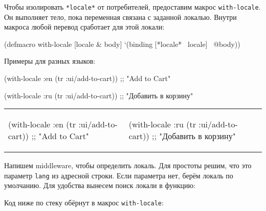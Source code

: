 
Чтобы изолировать \verb|*locale*| от потребителей, предоставим макрос
\verb|with-locale|. Он выполняет тело, пока переменная связана с заданной
локалью. Внутри макроса любой перевод сработает для этой локали:

\begin{english}
  \begin{clojure}
(defmacro with-locale
  [locale & body]
  `(binding [*locale* ~locale]
     ~@body))
  \end{clojure}
\end{english}

Примеры для разных языков:

\ifnarrow

\begin{clojure}
(with-locale :en
  (tr :ui/add-to-cart))
;; "Add to Cart"
\end{clojure}

\splitter

\begin{clojure}
(with-locale :ru
  (tr :ui/add-to-cart))
;; "Добавить в корзину"
\end{clojure}

\else


\noindent
\begin{tabular}{ @{}p{5cm} @{}p{5cm} }

  \begin{clojure}
(with-locale :en
  (tr :ui/add-to-cart))
;; "Add to Cart"
  \end{clojure}

&

  \begin{clojure}
(with-locale :ru
  (tr :ui/add-to-cart))
;; "Добавить в корзину"
  \end{clojure}

\end{tabular}


\fi


Напишем middleware, чтобы определить локаль. Для простоты решим, что это
параметр \verb|lang| из адресной строки. Если параметра нет, берём локаль по
умолчанию. Для удобства вынесем поиск локали в функцию:

Код ниже по стеку обёрнут в макрос \texttt{with\--lo\-ca\-le}:


